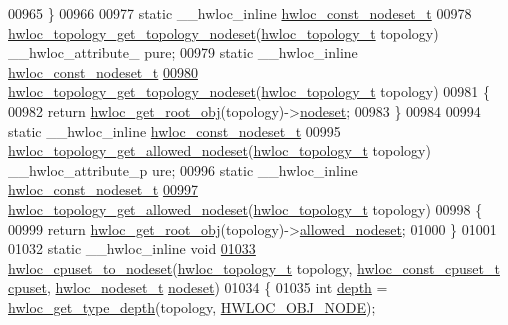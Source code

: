 \begin{DoxyCode}
00965 \}
00966 
00977 \textcolor{keyword}{static} \_\_hwloc\_inline \hyperlink{a00040_ga2f5276235841ad66a79bedad16a5a10c}{hwloc_const_nodeset_t}
00978 \hyperlink{a00061_ga78f80a3c04718ca273791a1071512031}{hwloc_topology_get_topology_nodeset}(\hyperlink{a00039_ga9d1e76ee15a7dee158b786c30b6a6e38}{hwloc_topology_t} topology) \_\_hwloc\_attribute\_
      pure;
00979 \textcolor{keyword}{static} \_\_hwloc\_inline \hyperlink{a00040_ga2f5276235841ad66a79bedad16a5a10c}{hwloc_const_nodeset_t}
\hypertarget{a00031_source_l00980}{}\hyperlink{a00061_ga78f80a3c04718ca273791a1071512031}{00980} \hyperlink{a00061_ga78f80a3c04718ca273791a1071512031}{hwloc_topology_get_topology_nodeset}(\hyperlink{a00039_ga9d1e76ee15a7dee158b786c30b6a6e38}{hwloc_topology_t} topology)
00981 \{
00982   \textcolor{keywordflow}{return} \hyperlink{a00053_gadbf58f6e187efbdb3cd9a8e30311b7d7}{hwloc_get_root_obj}(topology)->\hyperlink{a00016_a08f0d0e16c619a6e653526cbee4ffea3}{nodeset};
00983 \}
00984 
00994 \textcolor{keyword}{static} \_\_hwloc\_inline \hyperlink{a00040_ga2f5276235841ad66a79bedad16a5a10c}{hwloc_const_nodeset_t}
00995 \hyperlink{a00061_ga13915b8e074f59fbdf8f973739509293}{hwloc_topology_get_allowed_nodeset}(\hyperlink{a00039_ga9d1e76ee15a7dee158b786c30b6a6e38}{hwloc_topology_t} topology) \_\_hwloc\_attribute\_p
      ure;
00996 \textcolor{keyword}{static} \_\_hwloc\_inline \hyperlink{a00040_ga2f5276235841ad66a79bedad16a5a10c}{hwloc_const_nodeset_t}
\hypertarget{a00031_source_l00997}{}\hyperlink{a00061_ga13915b8e074f59fbdf8f973739509293}{00997} \hyperlink{a00061_ga13915b8e074f59fbdf8f973739509293}{hwloc_topology_get_allowed_nodeset}(\hyperlink{a00039_ga9d1e76ee15a7dee158b786c30b6a6e38}{hwloc_topology_t} topology)
00998 \{
00999   \textcolor{keywordflow}{return} \hyperlink{a00053_gadbf58f6e187efbdb3cd9a8e30311b7d7}{hwloc_get_root_obj}(topology)->\hyperlink{a00016_a19e3d0a5951a7510fc4fc4722a9bf531}{allowed_nodeset};
01000 \}
01001 
01032 \textcolor{keyword}{static} \_\_hwloc\_inline \textcolor{keywordtype}{void}
\hypertarget{a00031_source_l01033}{}\hyperlink{a00062_ga60ecc4ae480c28b5fbd34aca4fc37daa}{01033} \hyperlink{a00062_ga60ecc4ae480c28b5fbd34aca4fc37daa}{hwloc_cpuset_to_nodeset}(\hyperlink{a00039_ga9d1e76ee15a7dee158b786c30b6a6e38}{hwloc_topology_t} topology, \hyperlink{a00040_ga1f784433e9b606261f62d1134f6a3b25}{hwloc_const_cpuset_t} \hyperlink{a00016_a67925e0f2c47f50408fbdb9bddd0790f}{cpuset}, 
      \hyperlink{a00040_ga37e35730fa7e775b5bb0afe893d6d508}{hwloc_nodeset_t} \hyperlink{a00016_a08f0d0e16c619a6e653526cbee4ffea3}{nodeset})
01034 \{
01035         \textcolor{keywordtype}{int} \hyperlink{a00016_a9d82690370275d42d652eccdea5d3ee5}{depth} = \hyperlink{a00046_gaea7c64dd59467f5201ba87712710b14d}{hwloc_get_type_depth}(topology, \hyperlink{a00041_ggacd37bb612667dc437d66bfb175a8dc55aaf0964881117bdedf1a5e9332cd120dd}{HWLOC_OBJ_NODE});

\end{DoxyCode}
